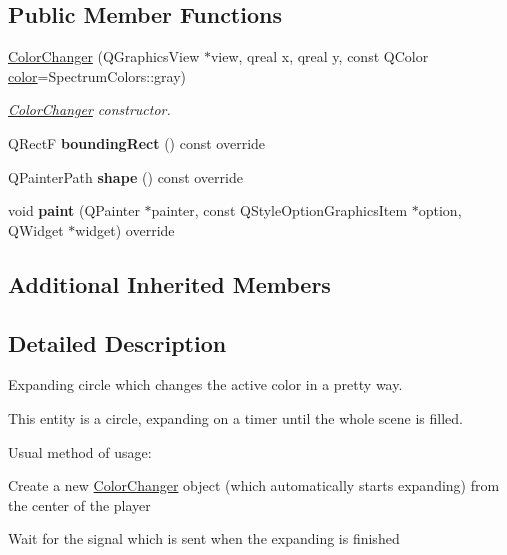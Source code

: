 \subsection*{Public Member Functions}
\begin{DoxyCompactItemize}
\item 
\hyperlink{class_color_changer_a00dc557d11916140b90a8569cba0d507}{Color\+Changer} (Q\+Graphics\+View $\ast$view, qreal x, qreal y, const Q\+Color \hyperlink{class_entity_ad14bf88ca550e2e5b13438a3faf545e6}{color}=Spectrum\+Colors\+::gray)
\begin{DoxyCompactList}\small\item\em \hyperlink{class_color_changer}{Color\+Changer} constructor. \end{DoxyCompactList}\item 
\mbox{\label{class_color_changer_aa8101dd864786e4abd8700d1b43501b9}} 
Q\+RectF {\bfseries bounding\+Rect} () const override
\item 
\mbox{\label{class_color_changer_a8164abe7d958432691f2b95c574c702a}} 
Q\+Painter\+Path {\bfseries shape} () const override
\item 
\mbox{\label{class_color_changer_a42f637d64bf3298d78341941843729fb}} 
void {\bfseries paint} (Q\+Painter $\ast$painter, const Q\+Style\+Option\+Graphics\+Item $\ast$option, Q\+Widget $\ast$widget) override
\end{DoxyCompactItemize}
\subsection*{Additional Inherited Members}


\subsection{Detailed Description}
Expanding circle which changes the active color in a pretty way. 

This entity is a circle, expanding on a timer until the whole scene is filled.

Usual method of usage\+:
\begin{DoxyItemize}
\item Create a new \hyperlink{class_color_changer}{Color\+Changer} object (which automatically starts expanding) from the center of the player
\item Wait for the signal which is sent when the expanding is finished
\end{DoxyItemize}

